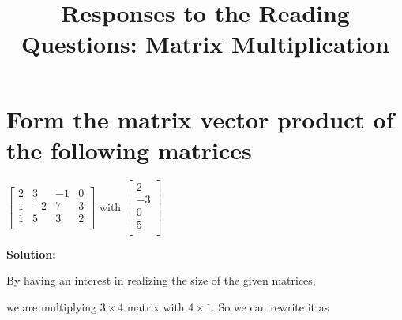 \documentclass{article}
\title{Responses to the Reading Questions: Matrix Multiplication}
\begin{document}
\maketitle

\newcommand{\sol} {
  \textbf{Solution:}
}

\newcommand{\LIVHS} {\textbf{Linearly Independent Vectors and Homogeneous Systems}}

\newcommand{\FVCS} {\textbf{Free Variables for Consistent Systems}}

\newcommand{\HSC} {\textbf{Homogeneous Systems are Consistent}}

\newcommand{\ls} {\(\mathcal{LS}(A,\textbf{0})\)}

\newcommand{\p} {$\boxed{1}$~}

\newcommand{\QAA} {
\begin{bmatrix}
  2 & 3 & -1 & 0 \\
  1 & -2 & 7 & 3 \\
  1 & 5 & 3 & 2 \\
\end{bmatrix}
}

\newcommand{\QAB} {
\begin{bmatrix}
  2 \\
  -3 \\
  0 \\
  5 \\
\end{bmatrix}
}

\newcommand{\QAC} {
\begin{bmatrix}
  6 & 8 & 4 \\
  -2 & 1 & 0 \\
  9 & -5 & 6 \\
\end{bmatrix}
}

\section{Form the matrix vector product of the following matrices}

\begin{center}
  \(\QAA\) with \(\QAB\)
\end{center}

\sol

By having an interest in realizing the size of the given matrices,

we are multiplying \(3 \times 4\) matrix with \(4 \times 1\). So we can rewrite it as
\end{document}
